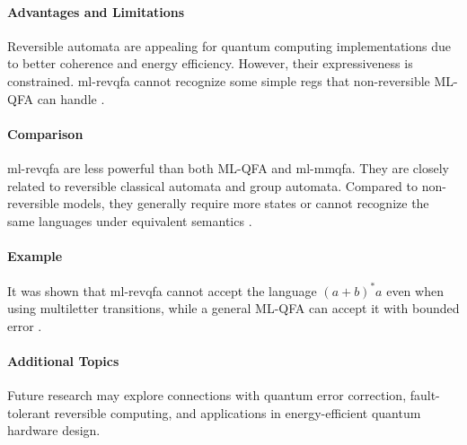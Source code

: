 \paragraph{Advantages and Limitations}
Reversible automata are appealing for quantum computing implementations due to better coherence and energy efficiency. However, their expressiveness is constrained. \gls{ml-revqfa} cannot recognize some simple \glspl{reg} that non-reversible ML-QFA can handle \cite{belovs2007multi}.

\paragraph{Comparison}
\gls{ml-revqfa} are less powerful than both ML-QFA and \gls{ml-mmqfa}. They are closely related to reversible classical automata and group automata. Compared to non-reversible models, they generally require more states or cannot recognize the same languages under equivalent semantics \cite{belovs2007multi}.

\paragraph{Example}
It was shown that \gls{ml-revqfa} cannot accept the language $(a+b)^*a$ even when using multiletter transitions, while a general ML-QFA can accept it with bounded error \cite{belovs2007multi}.

\paragraph{Additional Topics}
Future research may explore connections with quantum error correction, fault-tolerant reversible computing, and applications in energy-efficient quantum hardware design.


